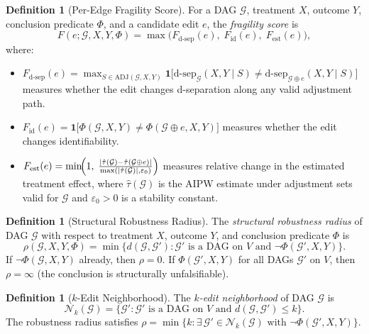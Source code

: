 \documentclass[11pt,a4paper]{article}
\theoremstyle{definition}
\newtheorem{definition}[theorem]{Definition}
\theoremstyle{remark}
\newcommand{\DAG}{\mathcal{G}}
\newcommand{\dsep}{\mathrm{d\text{-}sep}}
\newcommand{\editdist}{d}
\newcommand{\fragility}{F}
\newcommand{\radius}{\rho}
\newcommand{\Nk}{\mathcal{N}_k}
\newcommand{\Phi}{\varPhi}
\begin{document}
\begin{definition}[Per-Edge Fragility Score]\label{def:fragility}
For a DAG $\DAG$, treatment $X$, outcome $Y$, conclusion predicate $\Phi$, and a
candidate edit $e$, the \emph{fragility score} is
\[
  \fragility(e; \DAG, X, Y, \Phi) = \max\bigl(\fragility_{\dsep}(e),\;
  \fragility_{\mathrm{id}}(e),\; \fragility_{\mathrm{est}}(e)\bigr),
\]
where:
\begin{itemize}
  \item $\fragility_{\dsep}(e) = \max_{S \in \mathrm{ADJ}(\DAG,X,Y)}
    \mathbf{1}\bigl[\dsep_\DAG(X,Y \mid S) \neq \dsep_{\DAG \oplus e}(X,Y \mid S)\bigr]$
    measures whether the edit changes d-separation along any valid adjustment path.
  \item $\fragility_{\mathrm{id}}(e) = \mathbf{1}\bigl[\Phi(\DAG,X,Y)
    \neq \Phi(\DAG \oplus e, X, Y)\bigr]$ measures whether the edit changes
    identifiability.
  \item $\fragility_{\mathrm{est}}(e) = \min\!\Bigl(1,\;\frac{|\hat\tau(\DAG) - \hat\tau(\DAG \oplus e)|}
    {\max(|\hat\tau(\DAG)|, \varepsilon_0)}\Bigr)$ measures relative change in the estimated
    treatment effect, where $\hat\tau(\DAG)$ is the AIPW estimate under adjustment sets
    valid for $\DAG$ and $\varepsilon_0 > 0$ is a stability constant.
\end{itemize}
\end{definition}

\begin{definition}[Structural Robustness Radius]\label{def:radius}
The \emph{structural robustness radius} of DAG $\DAG$ with respect to treatment $X$,
outcome $Y$, and conclusion predicate $\Phi$ is
\[
  \radius(\DAG, X, Y, \Phi) = \min\bigl\{\editdist(\DAG, \DAG') :
  \DAG' \text{ is a DAG on } V \text{ and } \neg\Phi(\DAG', X, Y)\bigr\}.
\]
If $\neg\Phi(\DAG, X, Y)$ already, then $\radius = 0$. If $\Phi(\DAG', X, Y)$ for all
DAGs $\DAG'$ on $V$, then $\radius = \infty$ (the conclusion is structurally
unfalsifiable).
\end{definition}

\begin{definition}[$k$-Edit Neighborhood]\label{def:neighborhood}
The \emph{$k$-edit neighborhood} of DAG $\DAG$ is
\[
  \Nk(\DAG) = \bigl\{\DAG' : \DAG' \text{ is a DAG on } V \text{ and }
  \editdist(\DAG, \DAG') \leq k\bigr\}.
\]
The robustness radius satisfies
$\radius = \min\{k : \exists\, \DAG' \in \Nk(\DAG) \text{ with }
\neg\Phi(\DAG', X, Y)\}$.
\end{definition}
\end{document}
